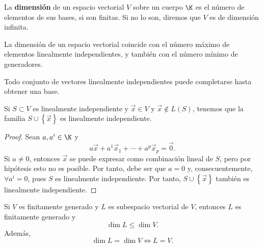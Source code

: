 \begin{fdefinition}[Dimensión]
\normalfont La \textbf{dimensión} de un espacio vectorial $\displaystyle V $ sobre un cuerpo $\displaystyle \K $ es el número de elementos de sus bases, si son finitas. Si no lo son, diremos que $\displaystyle V $ es de dimensión infinita.
\end{fdefinition}

\begin{fcolorary}[]
\normalfont La dimensión de un espacio vectorial coincide con el número máximo de elementos linealmente independientes, y también con el número mínimo de generadores.
\end{fcolorary}

\begin{fcolorary}[]
\normalfont Todo conjunto de vectores linealmente independientes puede completarse hasta obtener una base.
\end{fcolorary}

\begin{flema}[]
	\normalfont Si $S \subset V$ es linealmente independiente y $\displaystyle \vec{x} \in V $ y $\displaystyle \vec{x} \not\in L\left(S\right) $, tenemos que la familia $\displaystyle S \cup \left\{ \vec{x}\right\}   $ es linealmente independiente. 
\end{flema}

\begin{proof}
Sean $\displaystyle a,a^{i} \in \K $ y 
\[a\vec{x} + a^{1}\vec{x}_{1} + \cdots + a^{p}\vec{x}_{p} = \vec{0} .\]
Si $\displaystyle a \neq 0 $, entonces $\displaystyle \vec{x} $ se puede expresar como combinación lineal de $\displaystyle S $, pero por hipótesis esto no es posible. Por tanto, debe ser que $\displaystyle a = 0 $ y, consecuentemente, $\displaystyle \forall a^{i} = 0 $, pues $\displaystyle S $ es linealmente independiente. Por tanto, $\displaystyle S \cup \left\{ \vec{x}\right\}  $ también es linealmente independiente.
\end{proof}

\begin{fprop}[]
\normalfont Si $\displaystyle V $ es finitamente generado y $\displaystyle L $ es subespacio vectorial de $\displaystyle V $, entonces $\displaystyle L $ es finitamente generado y 
\[\dim L \leq \dim V .\]
Además, 
\[\dim L = \dim V \iff L = V .\]
\end{fprop}

